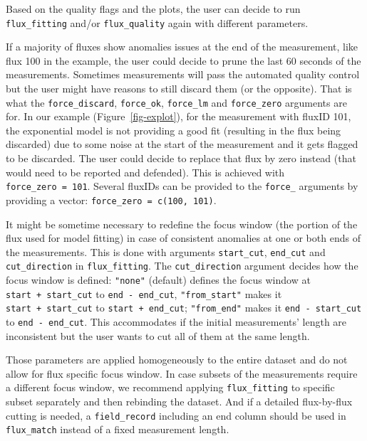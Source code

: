 \documentclass[
  letterpaper,
  DIV=11,
  numbers=noendperiod]{scrartcl}
\begin{document}
Based on the quality flags and the plots, the user can decide to run
\texttt{flux\_fitting} and/or \texttt{flux\_quality} again with
different parameters.

If a majority of fluxes show anomalies issues at the end of the
measurement, like flux 100 in the example, the user could decide to
prune the last 60 seconds of the measurements. Sometimes measurements
will pass the automated quality control but the user might have reasons
to still discard them (or the opposite). That is what the
\texttt{force\_discard}, \texttt{force\_ok}, \texttt{force\_lm} and
\texttt{force\_zero} arguments are for. In our example
(Figure~\ref{fig-explot}), for the measurement with fluxID 101, the
exponential model is not providing a good fit (resulting in the flux
being discarded) due to some noise at the start of the measurement and
it gets flagged to be discarded. The user could decide to replace that
flux by zero instead (that would need to be reported and defended). This
is achieved with \texttt{force\_zero\ =\ 101}. Several fluxIDs can be
provided to the \texttt{force\_} arguments by providing a vector:
\texttt{force\_zero\ =\ c(100,\ 101)}.

\begin{tcolorbox}[enhanced jigsaw, breakable, colback=white, coltitle=black, toprule=.15mm, titlerule=0mm, rightrule=.15mm, toptitle=1mm, opacitybacktitle=0.6, colbacktitle=quarto-callout-tip-color!10!white, bottomtitle=1mm, title={Redefining the focus window}, arc=.35mm, colframe=quarto-callout-tip-color-frame, bottomrule=.15mm, leftrule=.75mm, left=2mm, opacityback=0]

It might be sometime necessary to redefine the focus window (the portion
of the flux used for model fitting) in case of consistent anomalies at
one or both ends of the measurements. This is done with arguments
\texttt{start\_cut}, \texttt{end\_cut} and \texttt{cut\_direction} in
\texttt{flux\_fitting}. The \texttt{cut\_direction} argument decides how
the focus window is defined: \texttt{"none"} (default) defines the focus
window at \texttt{start\ +\ start\_cut} to \texttt{end\ -\ end\_cut},
\texttt{"from\_start"} makes it \texttt{start\ +\ start\_cut} to
\texttt{start\ +\ end\_cut}; \texttt{"from\_end"} makes it
\texttt{end\ -\ start\_cut} to \texttt{end\ -\ end\_cut}. This
accommodates if the initial measurements' length are inconsistent but
the user wants to cut all of them at the same length.

Those parameters are applied homogeneously to the entire dataset and do
not allow for flux specific focus window. In case subsets of the
measurements require a different focus window, we recommend applying
\texttt{flux\_fitting} to specific subset separately and then rebinding
the dataset. And if a detailed flux-by-flux cutting is needed, a
\texttt{field\_record} including an end column should be used in
\texttt{flux\_match} instead of a fixed measurement length.

\end{tcolorbox}
\end{document}
